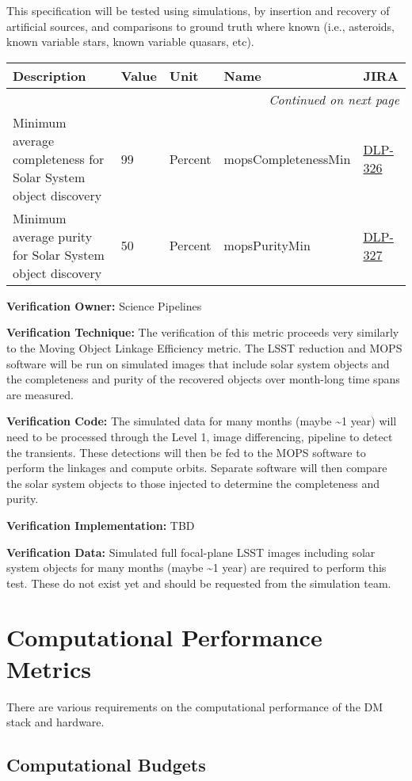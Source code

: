 \documentclass[DM,lsstdraft,toc]{lsstdoc}
\makeatletter
\newcommand{\jira}[1]{\href{https://jira.lsstcorp.org/browse/#1}{#1}}
\newenvironment{metric}[0]{%
\setlength\LTleft{0pt}
\setlength\LTright{\fill}
\begin{longtable}[]{@{}p{0.4\textwidth}lp{0.75in}p{1.3in}p{0.75in}@{}}

\hline \textbf{Description} & \textbf{Value} & \textbf{Unit} & \textbf{Name} & \textbf{JIRA} \\ \hline
\endhead

\hline \multicolumn{5}{r}{\emph{Continued on next page}} \\
\endfoot

\hline\hline
\endlastfoot
}{%
\hline
\end{longtable}
}
\makeatother
\begin{document}
This specification will be tested using simulations, by insertion and
recovery of artificial sources, and comparisons to ground truth where
known (i.e., asteroids, known variable stars, known variable quasars,
etc).

\begin{metric}
Minimum average completeness for Solar System object discovery & 99 &
Percent & mops\-Completeness\-Min & \jira{DLP-326}\tabularnewline
Minimum average purity for Solar System object discovery & 50 & Percent
& mopsPurityMin & \jira{DLP-327}\tabularnewline
\end{metric}

\textbf{Verification Owner:} Science Pipelines

\textbf{Verification Technique:} The verification of this metric
proceeds very similarly to the Moving Object Linkage Efficiency metric.
The LSST reduction and MOPS software will be run on simulated images
that include solar system objects and the completeness and purity of the
recovered objects over month-long time spans are measured.

\textbf{Verification Code:} The simulated data for many months (maybe
\textasciitilde{}1 year) will need to be processed through the Level 1,
image differencing, pipeline to detect the transients. These detections
will then be fed to the MOPS software to perform the linkages and
compute orbits. Separate software will then compare the solar system
objects to those injected to determine the completeness and purity.

\textbf{Verification Implementation:} TBD

\textbf{Verification Data:} Simulated full focal-plane LSST images
including solar system objects for many months (maybe \textasciitilde{}1
year) are required to perform this test. These do not exist yet and
should be requested from the simulation team.

\section{Computational Performance
Metrics}\label{computational-performance-metrics}

There are various requirements on the computational performance of the
DM stack and hardware.

\subsection{Computational Budgets}\label{computational-budgets}
\end{document}
